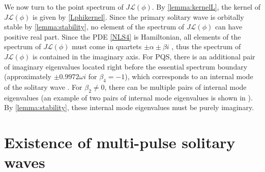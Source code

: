 \documentclass[12pt]{elsarticle}
\def\calL{{\mathcal L}}
\begin{document}
We now turn to the point spectrum of $J \calL(\phi)$. By \cref{lemma:kernelL}, the kernel of $J \calL(\phi)$ is given by \cref{Lphikernel}. Since the primary solitary wave is orbitally stable by \cref{lemma:stability}, no element of the spectrum of $J \calL(\phi)$ can have positive real part. Since the PDE \cref{NLS4} is Hamiltonian, all elements of the spectrum of $J \calL(\phi)$ must come in quartets $\pm \alpha \pm \beta i$ \cite[Proposition 7.0.1]{Kapitula2013}, thus the spectrum of $J \calL(\phi)$ is contained in the imaginary axis. For PQS, there is an additional pair of imaginary eigenvalues located right before the essential spectrum boundary (approximately $\pm 0.9972 \omega i$ for $\beta_4 = -1$), which corresponds to an internal mode of the solitary wave \cite{Tam2019}. For $\beta_2 \neq 0$, there can be multiple pairs of internal mode eigenvalues (an example of two pairs of internal mode eigenvalues is shown in \cite[Figure 9]{Tam2020}). By \cref{lemma:stability}, these internal mode eigenvalues must be purely imaginary.

\section{Existence of multi-pulse solitary waves}
\end{document}

